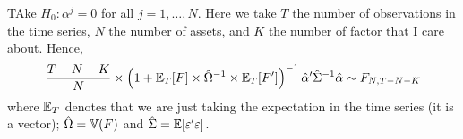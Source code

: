 TAke $H_0\colon \alpha^j = 0$ for all $j=1,\ldots, N$. Here we take $T$ the number of observations in the time series, $N$ the number of assets, and $K$ the number of factor that I care about. Hence, 
$$
\frac{T-N-K}{N}\times\left(1 + \mathbb{E}_T[F]\times \hat{\Omega}^{-1}\times\mathbb{E}_T[F']\right)^{-1}\hat{\alpha}'\hat{\Sigma}^{-1}\hat{\alpha}\sim F_{N, T-N-K}
$$
where $\mathbb{E}_T$ denotes that we are just taking the expectation in the time series (it is a vector); $\hat{\Omega} = \mathbb{V}(F)$ and $\hat{\Sigma} = \mathbb{E}[\varepsilon'\varepsilon]$.
